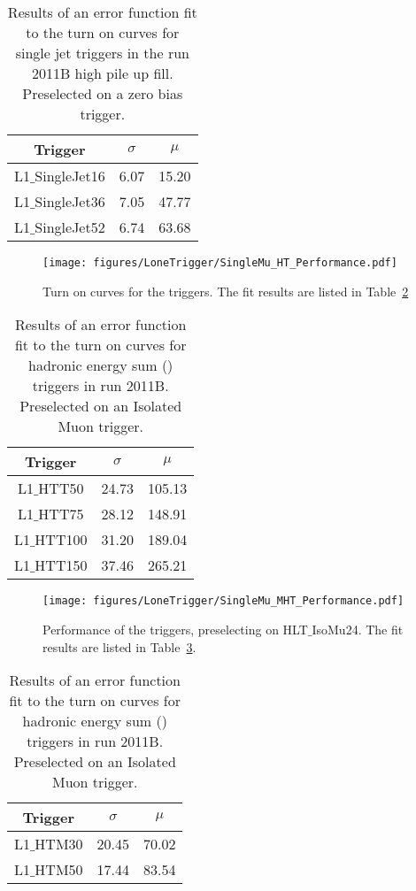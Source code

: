 \begin{table}[ht]
\begin{tabular}{|c|c|c|}
\hline
Trigger & $\sigma$ & $\mu$\\
\hline
L1$\_$SingleJet16 & 6.07 & 15.20 \\
\hline
L1$\_$SingleJet36 & 7.05 & 47.77 \\
\hline
L1$\_$SingleJet52 & 6.74 & 63.68 \\
\hline
\end{tabular}
\caption{Results of an error function fit to the turn on curves for \Lone 
single jet triggers in the run 2011B high pile up fill. Preselected on a zero
bias trigger.}
\label{tab:2011B_HighPU_NoFastJet}
\end{table}


\begin{figure}[ht]
  \centering
    \texttt{[image: figures/LoneTrigger/SingleMu\_HT\_Performance.pdf]}
  \caption{Turn on curves for the \Lone \HT triggers. The fit results are listed in Table~\ref{tab:2011B_HT_performance}}
  \label{fig:figures_SingleMu_HT_Performance}
\end{figure}

\begin{table}[ht]
 \centering
\begin{tabular}{|c|c|c|}
\hline
\hline
Trigger & $\sigma$ & $\mu$\\
\hline
L1$\_$HTT50 & 24.73 & 105.13 \\
\hline
L1$\_$HTT75 & 28.12 & 148.91 \\
\hline
L1$\_$HTT100 & 31.20 & 189.04 \\
\hline
L1$\_$HTT150 & 37.46 & 265.21 \\
\hline
\hline
\end{tabular}
\caption{Results of an error function fit to the turn on curves for \Lone 
hadronic energy sum (\HT) triggers in run 2011B. Preselected on an Isolated Muon trigger.}
\label{tab:2011B_HT_performance}
\end{table}


\begin{figure}[ht]
  \centering
    \texttt{[image: figures/LoneTrigger/SingleMu\_MHT\_Performance.pdf]}
  \caption{Performance of the \Lone \HTm triggers, preselecting on 
  HLT$\_$IsoMu24. The fit results are listed in 
  Table~\ref{tab:2011B_HTM_performance}. }
  \label{fig:figures_SingleMu_MHT_Performance}
\end{figure}

  
\begin{table}[ht]
 \centering
\begin{tabular}{|c|c|c|}
\hline
\hline
Trigger & $\sigma$ & $\mu$\\
\hline
L1$\_$HTM30 & 20.45 & 70.02 \\
\hline
L1$\_$HTM50 & 17.44 & 83.54 \\
\hline
\hline
\end{tabular}
\caption{Results of an error function fit to the turn on curves for \Lone 
hadronic energy sum (\HTm) triggers in run 2011B. Preselected on an Isolated Muon trigger.}
\label{tab:2011B_HTM_performance}
\end{table}

